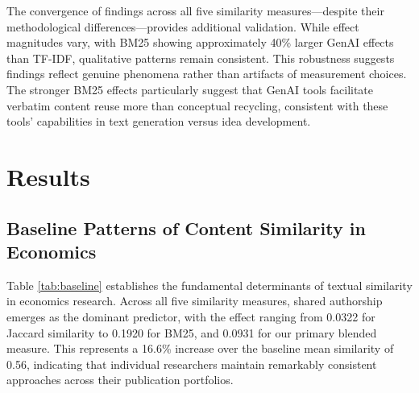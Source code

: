\documentclass[12pt]{article}
\begin{document}
The convergence of findings across all five similarity measures—despite their methodological differences—provides additional validation. While effect magnitudes vary, with BM25 showing approximately 40\% larger GenAI effects than TF-IDF, qualitative patterns remain consistent. This robustness suggests findings reflect genuine phenomena rather than artifacts of measurement choices. The stronger BM25 effects particularly suggest that GenAI tools facilitate verbatim content reuse more than conceptual recycling, consistent with these tools' capabilities in text generation versus idea development.

\section{Results}
\label{sec:results}
\subsection{Baseline Patterns of Content Similarity in Economics}

Table \ref{tab:baseline} establishes the fundamental determinants of textual similarity in economics research. Across all five similarity measures, shared authorship emerges as the dominant predictor, with the effect ranging from 0.0322 for Jaccard similarity to 0.1920 for BM25, and 0.0931 for our primary blended measure. This represents a 16.6\% increase over the baseline mean similarity of 0.56, indicating that individual researchers maintain remarkably consistent approaches across their publication portfolios.
\end{document}
